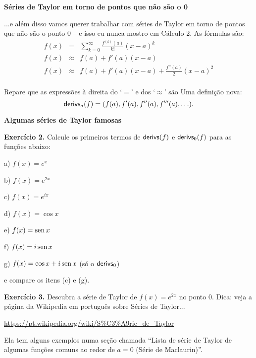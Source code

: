\documentclass[oneside,12pt]{article}
\begin{document}

{\bf Séries de Taylor em torno de pontos que não são o 0}

...e além disso vamos querer trabalhar com séries de Taylor em torno
de pontos que não são o ponto 0 -- e isso eu nunca mostro em Cálculo
2. As fórmulas são:
%
$$\begin{array}{rcl}
  f(x) &=& \displaystyle \sum_{k=0}^∞ \frac{f^{(k)}(a)}{k!} (x-a)^k \\[10pt]
  f(x) &≈& f(a) + f'(a)(x-a) \\
  f(x) &≈& f(a) + f'(a)(x-a) + \frac{f''(a)}{2} (x-a)^2 \\[5pt]
  \end{array}
$$

Repare que as expressões à direita do `$=$' e dos `$≈$' são
 Uma definição nova:
%
$$\mathsf{derivs}_a(f) = (f(a), f'(a), f''(a), f'''(a), \ldots).$$


\newpage


{\bf Algumas séries de Taylor famosas}

\ssk

{\bf Exercício 2.} Calcule os primeiros termos de $\mathsf{derivs}(f)$ e
$\mathsf{derivs}_0(f)$ para as funções abaixo:

a) $f(x) = e^x$

b) $f(x) = e^{2x}$

c) $f(x) = e^{ix}$

d) $f(x) = \cos x$

e) $f(x) = \operatorname{sen} x$

f) $f(x) = i\operatorname{sen} x$

g) $f(x) = \cos x + i\operatorname{sen} x$ \qquad (só o $\mathsf{derivs}_0$)

e compare os itens (c) e (g).

\newpage

{\bf Exercício 3.} Descubra a série de Taylor de $f(x) = e^{2x}$ no
ponto 0. Dica: veja a página da Wikipedia em português sobre Séries de
Taylor...

\ssk

\url{https://pt.wikipedia.org/wiki/S\%C3\%A9rie_de_Taylor}

\ssk

Ela tem alguns exemplos numa seção chamada ``Lista de série de Taylor
de algumas funções comuns ao redor de $a=0$ (Série de Maclaurin)''.
\end{document}
